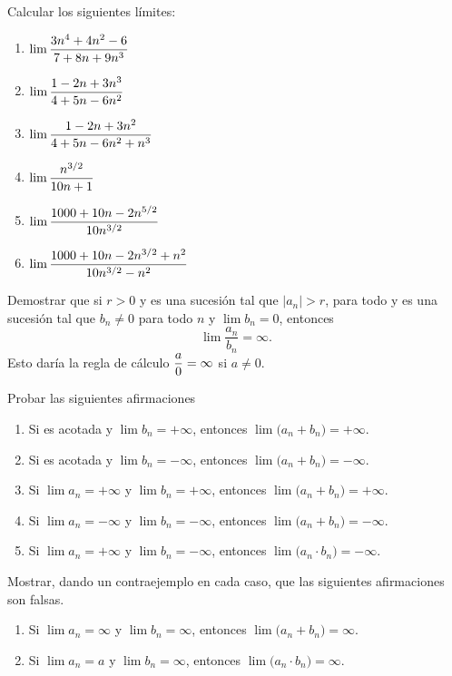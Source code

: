 
    \item Calcular los siguientes límites:

    \begin{multicols}{2}
        \begin{enumerate}
            \item $\displaystyle \lim \frac{3n^4+4n^2-6}{7+8n+9n^3} $
            \item $\displaystyle \lim \frac{1-2n+3n^3}{4+5n-6n^2} $
            \item $\displaystyle \lim \frac{1-2n+3n^2}{4+5n-6n^2+n^3} $
            \item $\displaystyle \lim \frac{n^{3/2}}{10n+1} $
            \item $\displaystyle \lim \frac{1000 + 10 n - 2 n^{5/2}}{10 n^{3/2}} $
            \item $\displaystyle \lim \frac{1000 + 10 n - 2 n^{3/2}+n^2}{10 n^{3/2}-n^2} $
        \end{enumerate}
    \end{multicols}
    
\item Demostrar que si $r>0$ y \sucan es una sucesión tal que $|a_n| > r$, para todo \niN y \sucbn es una sucesión tal que $b_n\neq 0$ para todo $n$ y $\lim b_n = 0$, entonces
\[ \lim \frac{a_n}{b_n} = \infty. \]
Esto daría la regla de cálculo $\displaystyle\frac{a}{0} = \infty$ si $a\neq 0$.

\item Probar las siguientes afirmaciones
\begin{enumerate}
    \item Si \sucan es acotada y $\lim b_n = +\infty$, entonces $\lim\big(a_n+b_n) = +\infty$.
    \item Si \sucan es acotada y $\lim b_n = -\infty$, entonces $\lim\big(a_n+b_n) = -\infty$.
    \item Si $\lim a_n = +\infty$ y $\lim b_n = +\infty$, entonces $\lim\big(a_n+b_n) = +\infty$.
    \item Si $\lim a_n = -\infty$ y $\lim b_n = -\infty$, entonces $\lim\big(a_n+b_n) = -\infty$.
    \item Si $\lim a_n = +\infty$ y $\lim b_n = -\infty$, entonces $\lim\big(a_n\cdot b_n) = -\infty$.
\end{enumerate}

\item Mostrar, dando un contraejemplo en cada caso, que las siguientes afirmaciones son falsas.
\begin{enumerate}
    \item Si $\lim a_n = \infty$ y $\lim b_n = \infty$, entonces $\lim\big(a_n + b_n) = \infty$.
    \item Si $\lim a_n = a$ y $\lim b_n = \infty$, entonces $\lim\big(a_n \cdot b_n) = \infty$.
\end{enumerate}

